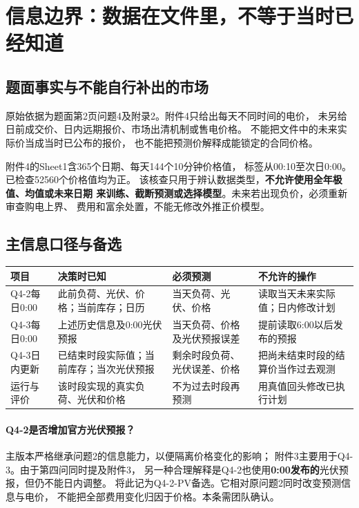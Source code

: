 \documentclass[UTF8,11pt]{ctexart}
\begin{document}
\section{信息边界：数据在文件里，不等于当时已经知道}
\subsection{题面事实与不能自行补出的市场}
原始依据为题面第2页问题4及附录2。附件4只给出每天不同时间的电价，
未另给日前成交价、日内远期报价、市场出清机制或售电价格。
不能把文件中的未来实际价当成当时已公布的报价，
也不能把预测价解释成能锁定的合同价格。

附件4的Sheet1含365个日期、每天144个10分钟价格值，
标签从00:10至次日0:00。已检查52560个价格值均为正。
该核查只用于辨认数据类型，\textbf{不允许使用全年极值、均值或未来日期
来训练、截断预测或选择模型}。未来若出现负价，必须重新审查购电上界、
费用和富余处置，不能无修改外推正价模型。

\subsection{主信息口径与备选}
\begin{longtable}{p{2.1cm}p{4.1cm}p{3.8cm}p{3.8cm}}
\toprule 项目 & 决策时已知 & 必须预测 & 不允许的操作\\ \midrule
\endhead
Q4-2每日0:00 &
此前负荷、光伏、价格；当前库存；日历 &
当天负荷、光伏、价格 &
读取当天未来实际值；日内修改计划\\
Q4-3每日0:00 &
上述历史信息及0:00光伏预报 &
当天负荷、价格及光伏预报误差 &
提前读取6:00以后发布的预报\\
Q4-3日内更新 &
已结束时段实际值；当前库存；当次光伏预报 &
剩余时段负荷、光伏误差、价格 &
把尚未结束时段的结算价当作过去观测\\
运行与评价 &
该时段实现的真实负荷、光伏和价格 &
不为过去时段再预测 &
用真值回头修改已执行计划\\
\bottomrule
\end{longtable}

\paragraph{Q4-2是否增加官方光伏预报？}
主版本严格继承问题2的信息能力，以便隔离价格变化的影响；
附件3主要用于Q4-3。由于第四问同时提及附件3，
另一种合理解释是Q4-2也使用\textbf{0:00发布的}光伏预报，但仍不能日内调整。
将此记为Q4-2-PV备选。它相对原问题2同时改变预测信息与电价，
不能把全部费用变化归因于价格。本条需团队确认。
\end{document}
